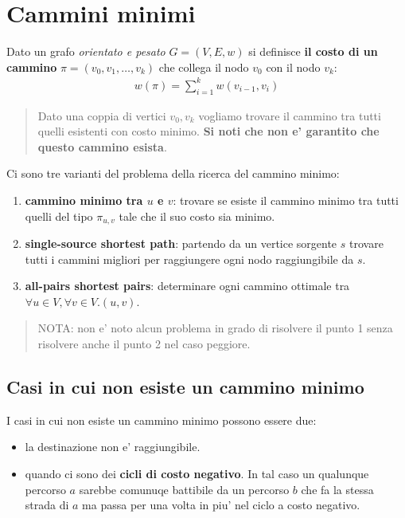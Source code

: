 \documentclass{article}
\begin{document}
\section{Cammini minimi}

Dato un grafo \emph{orientato e pesato} $G=(V,E,w)$ si definisce \textbf{il costo
di un cammino} $\pi = (v_0, v_1, \ldots, v_k)$ che collega il nodo $v_0$ con il
nodo $v_k$:
\begin{align*}
  w(\pi) = \sum_{i=1}^k w(v_{i-1}, v_i)
\end{align*}

\begin{quote}
  Dato una coppia di vertici $v_0, v_k$ vogliamo trovare il cammino tra tutti
  quelli esistenti con costo minimo. \textbf{Si noti che non e' garantito che
  questo cammino esista}.
\end{quote}

\noindent Ci sono tre varianti del problema della ricerca del cammino minimo:
\begin{enumerate}
  \item \textbf{cammino minimo tra $u$ e $v$}: trovare se esiste il cammino minimo
    tra tutti quelli del tipo $\pi_{u,v}$ tale che il suo costo sia minimo.
  \item \textbf{single-source shortest path}: partendo da un vertice sorgente $s$
    trovare tutti i cammini migliori per raggiungere ogni nodo raggiungibile da $s$.
  \item \textbf{all-pairs shortest pairs}: determinare ogni cammino ottimale tra
    $\forall u \in V, \forall v \in V. (u, v)$.
\end{enumerate}

\begin{quote}
  NOTA: non e' noto alcun problema in grado di risolvere il punto 1 senza risolvere
  anche il punto 2 nel caso peggiore.
\end{quote}

\subsection{Casi in cui non esiste un cammino minimo}

I casi in cui non esiste un cammino minimo possono essere due:
\begin{itemize}
  \item la destinazione non e' raggiungibile.
  \item quando ci sono dei \textbf{cicli di costo negativo}. In tal caso un
    qualunque percorso $a$ sarebbe comunuqe battibile da un percorso $b$ che fa
    la stessa strada di $a$ ma passa per una volta in piu' nel ciclo a costo negativo.
\end{itemize}
\end{document}
